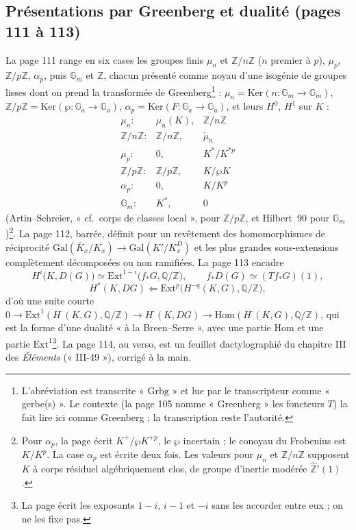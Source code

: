 \documentclass[11pt,a4paper]{article}
\begin{document}
\subsection*{Présentations par Greenberg et dualité (pages 111 à 113)}

La page 111 range en six cases les groupes finis $\mu_n$ et
$\mathbb{Z}/n\mathbb{Z}$ ($n$ premier à $p$), $\mu_p$, $\mathbb{Z}/p\mathbb{Z}$,
$\alpha_p$, puis $\mathbb{G}_m$ et $\mathbb{Z}$, chacun présenté comme noyau d'une
isogénie de groupes lisses dont on prend la transformée de
Greenberg\footnote{L'abréviation est transcrite « $\mathrm{Grbg}$ » et lue par le
transcripteur comme « gerbe(s) ». Le contexte (la page 105 nomme « Greenberg »
les foncteurs $T$) la fait lire ici comme Greenberg ; la transcription reste
l'autorité.} : $\mu_n = \mathrm{Ker}(n : \mathbb{G}_m \to \mathbb{G}_m)$,
$\mathbb{Z}/p\mathbb{Z} = \mathrm{Ker}(\wp : \mathbb{G}_a \to \mathbb{G}_a)$,
$\alpha_p = \mathrm{Ker}(F : \mathbb{G}_a \to \mathbb{G}_a)$, et leurs $H^0$, $H^1$
sur $K$ :
\[
\begin{array}{lll}
\mu_n : & \mu_n(K), & \mathbb{Z}/n\mathbb{Z} \\
\mathbb{Z}/n\mathbb{Z} : & \mathbb{Z}/n\mathbb{Z}, & \check\mu_n \\
\mu_p : & 0, & K^{*}/K^{*p} \\
\mathbb{Z}/p\mathbb{Z} : & \mathbb{Z}/p\mathbb{Z}, & K/\wp K \\
\alpha_p : & 0, & K/K^{p} \\
\mathbb{G}_m : & K^{*}, & 0
\end{array}
\]
(Artin–Schreier, « cf.\ corps de classes local », pour $\mathbb{Z}/p\mathbb{Z}$, et
Hilbert~90 pour $\mathbb{G}_m$)\footnote{Pour $\alpha_p$, la page écrit
$K^{+}/\wp K^{+p}$, le $\wp$ incertain ; le conoyau du Frobenius est $K/K^p$. La
case $\alpha_p$ est écrite deux fois. Les valeurs pour $\mu_n$ et
$\mathbb{Z}/n\mathbb{Z}$ supposent $K$ à corps résiduel algébriquement clos, de
groupe d'inertie modérée $\hat{\mathbb{Z}}'(1)$.}. La page 112, barrée,
définit pour un revêtement des homomorphismes de réciprocité
$\mathrm{Gal}(\bar K_x/K_x) \to \mathrm{Gal}(K'/K^{D}_x)$ et les plus grandes
sous-extensions complètement décomposées ou non ramifiées. La page 113 encadre
\[
H^i\bigl(K, D(G)\bigr) \simeq \mathrm{Ext}^{1-i}\bigl(f_*G, \mathbb{Q}/\mathbb{Z}\bigr),
\qquad f_* D(G) \simeq (T f_*G)(1),
\]
\[
H^{*}(K, DG) \Longleftarrow \mathrm{Ext}^p\bigl(H^{-q}(K, G), \mathbb{Q}/\mathbb{Z}\bigr),
\]
d'où une suite courte $0 \to \mathrm{Ext}^1(H^{\cdot}(K, G), \mathbb{Q}/\mathbb{Z})
\to H^{\cdot}(K, DG) \to \mathrm{Hom}(H^{\cdot}(K, G), \mathbb{Q}/\mathbb{Z})$,
qui est la forme d'une dualité « à la Breen–Serre », avec une partie $\mathrm{Hom}$
et une partie $\mathrm{Ext}^1$\footnote{La page écrit les exposants $1 - i$,
$i - 1$ et $-i$ sans les accorder entre eux ; on ne les fixe pas.}. La page 114,
au verso, est un feuillet dactylographié du chapitre III des \emph{Éléments}
(« III-49 »), corrigé à la main.
\end{document}
